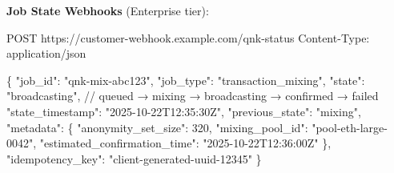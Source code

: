 \documentclass[
  11pt,
]{article}
\newenvironment{Shaded}{\begin{snugshade}}{\end{snugshade}}
\newcommand{\BuiltInTok}[1]{#1}
\newcommand{\CommentTok}[1]{\textcolor[rgb]{0.56,0.35,0.01}{\textit{#1}}}
\newcommand{\ControlFlowTok}[1]{\textcolor[rgb]{0.13,0.29,0.53}{\textbf{#1}}}
\newcommand{\FunctionTok}[1]{\textcolor[rgb]{0.00,0.00,0.00}{#1}}
\newcommand{\KeywordTok}[1]{\textcolor[rgb]{0.13,0.29,0.53}{\textbf{#1}}}
\newcommand{\NormalTok}[1]{#1}
\newcommand{\OperatorTok}[1]{\textcolor[rgb]{0.81,0.36,0.00}{\textbf{#1}}}
\newcommand{\SpecialCharTok}[1]{\textcolor[rgb]{0.00,0.00,0.00}{#1}}
\newcommand{\StringTok}[1]{\textcolor[rgb]{0.31,0.60,0.02}{#1}}
\newcommand{\VerbatimStringTok}[1]{\textcolor[rgb]{0.31,0.60,0.02}{#1}}
\begin{document}
\begin{Shaded}
\end{Shaded}

\textbf{Job State Webhooks} (Enterprise tier):

\begin{Shaded}
\begin{Highlighting}[]
\NormalTok{POST https://customer{-}webhook.example.com/qnk{-}status}
\NormalTok{Content{-}Type: application/json}

\NormalTok{\{}
\NormalTok{  "job\_id": "qnk{-}mix{-}abc123",}
\NormalTok{  "job\_type": "transaction\_mixing",}
\NormalTok{  "state": "broadcasting",  // queued → mixing → broadcasting → confirmed → failed}
\NormalTok{  "state\_timestamp": "2025{-}10{-}22T12:35:30Z",}
\NormalTok{  "previous\_state": "mixing",}
\NormalTok{  "metadata": \{}
\NormalTok{    "anonymity\_set\_size": 320,}
\NormalTok{    "mixing\_pool\_id": "pool{-}eth{-}large{-}0042",}
\NormalTok{    "estimated\_confirmation\_time": "2025{-}10{-}22T12:36:00Z"}
\NormalTok{  \},}
\NormalTok{  "idempotency\_key": "client{-}generated{-}uuid{-}12345"}
\NormalTok{\}}
\end{Highlighting}
\end{Shaded}
\end{document}
